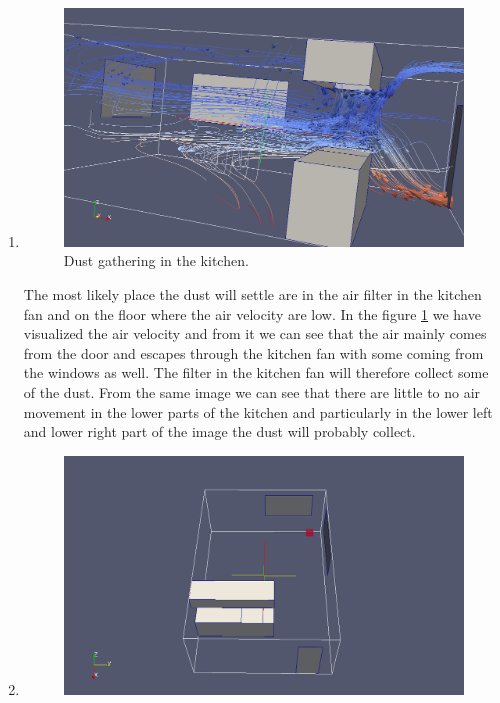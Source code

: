 \documentclass[a4paper]{article}
\begin{document}
\begin{enumerate}
    \item
        \begin{figure}[H]
            \includegraphics[width=1\linewidth]{lab5/kitchen-dust-screenshot.png}
            \caption{Dust gathering in the kitchen.}
            \label{fig:dust}
        \end{figure}
        The most likely place the dust will settle are in the air filter in the
        kitchen fan and on the floor where the air velocity are low. In the
        figure \ref{fig:dust} we have visualized the air velocity and from it we can see
        that the air mainly comes from the door and escapes through the kitchen
        fan with some coming from the windows as well. The filter in the kitchen
        fan will therefore collect some of the dust. From the same image we can
        see that there are little to no air movement in the lower parts of the
        kitchen and particularly in the lower left and lower right part of the
        image the dust will probably collect.
    \item
        \begin{figure}[H]
            \includegraphics[width=1\linewidth]{lab5/kitchen-highest-pressure-screenshot.png}

\end{figure}
\end{enumerate}
\end{document}
